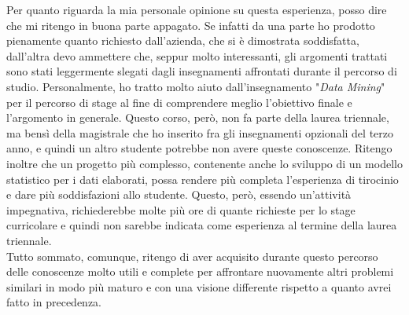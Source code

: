 \noindent Per quanto riguarda la mia personale opinione su questa esperienza, posso dire che mi ritengo in buona parte appagato. Se infatti da una parte ho prodotto pienamente quanto richiesto dall'azienda, che si è dimostrata soddisfatta, dall'altra devo ammettere che, seppur molto interessanti, gli argomenti trattati sono stati leggermente slegati dagli insegnamenti affrontati durante il percorso di studio. Personalmente, ho tratto molto aiuto dall'insegnamento "\textit{Data Mining}" per il percorso di stage al fine di comprendere meglio l'obiettivo finale e l'argomento in generale. Questo corso, però, non fa parte della laurea triennale, ma bensì della magistrale che ho inserito fra gli insegnamenti opzionali del terzo anno, e quindi un altro studente potrebbe non avere queste conoscenze. Ritengo inoltre che un progetto più complesso, contenente anche lo sviluppo di un modello statistico per i dati elaborati, possa rendere più completa l'esperienza di tirocinio e dare più soddisfazioni allo studente. Questo, però, essendo un'attività impegnativa, richiederebbe molte più ore di quante richieste per lo stage curricolare e quindi non sarebbe indicata come esperienza al termine della laurea triennale. \\
Tutto sommato, comunque, ritengo di aver acquisito durante questo percorso delle conoscenze molto utili e complete per affrontare nuovamente altri problemi similari in modo più maturo e con una visione differente rispetto a quanto avrei fatto in precedenza.